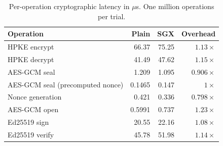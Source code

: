 \begin{table}
\centering
\begin{tabular}{lrrr}
\toprule
Operation & Plain & SGX & Overhead \\
\midrule
HPKE encrypt & 66.37 & 75.25 & $1.13\times$ \\
HPKE decrypt & 41.49 & 47.62 & $1.15\times$ \\
AES-GCM seal & 1.209 & 1.095 & $0.906\times$ \\
\quad AES-GCM seal (precomputed nonce) & 0.1465 & 0.147 & $1\times$ \\
\quad Nonce generation & 0.421 & 0.336 & $0.798\times$ \\
AES-GCM open & 0.5991 & 0.737 & $1.23\times$ \\
Ed25519 sign & 20.55 & 22.16 & $1.08\times$ \\
Ed25519 verify & 45.78 & 51.98 & $1.14\times$ \\
\bottomrule
\end{tabular}
\caption{Per-operation cryptographic latency in ${}\mu$s. One million operations per trial.}
\label{tab:reproduction-table4}
\end{table}
